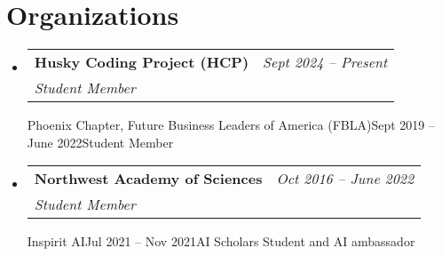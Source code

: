 \documentclass[letterpaper,11pt]{article}
\makeatletter
\newcommand{\resumeOrganizationHeading}[4]{
  \vspace{-2pt}\item
    \begin{tabular*}{0.97\textwidth}[t]{l@{\extracolsep{\fill}}r}
      \textbf{#1} & \textit{\small #2} \\
      \textit{\small#3}
    \end{tabular*}\vspace{-7pt}
}
\newcommand{\resumeSubHeadingListStart}{\begin{itemize}[leftmargin=0.15in, label={}]}
\newcommand{\resumeSubHeadingListEnd}{\end{itemize}}
\makeatother
\begin{document}

 \section{Organizations}
 \resumeSubHeadingListStart

  \resumeOrganizationHeading
    {Husky Coding Project (HCP)}{Sept 2024 -- Present}{Student Member}

     \resumeOrganizationHeading
     {Phoenix Chapter, Future Business Leaders of America (FBLA)}{Sept 2019 -- June 2022}{Student Member}

     \resumeOrganizationHeading
     {Northwest Academy of Sciences}{Oct 2016 -- June 2022}{Student Member}

     \resumeOrganizationHeading
     {Inspirit AI}{Jul 2021 -- Nov 2021}{AI Scholars Student and AI ambassador}

     

  
 \resumeSubHeadingListEnd





        
\end{document}
